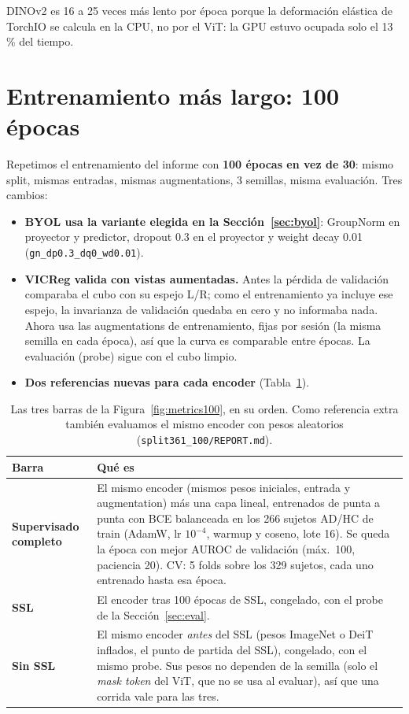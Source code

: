 \documentclass[11pt,a4paper]{article}
\begin{document}
DINOv2 es 16 a 25 veces más lento por época porque la deformación elástica de TorchIO se calcula en la CPU,
no por el ViT: la GPU estuvo ocupada solo el 13\,\% del tiempo.

\section{Entrenamiento más largo: 100 épocas}
\label{sec:e100}

Repetimos el entrenamiento del informe con \textbf{100 épocas en vez de 30}: mismo split, mismas
entradas, mismas augmentations, 3 semillas, misma evaluación. Tres cambios:

\begin{itemize}
\item \textbf{BYOL usa la variante elegida en la Sección~\ref{sec:byol}}: GroupNorm en proyector y
  predictor, dropout 0.3 en el proyector y weight decay 0.01 (\texttt{gn\_dp0.3\_dq0\_wd0.01}).
\item \textbf{VICReg valida con vistas aumentadas.} Antes la pérdida de validación comparaba el cubo
  con su espejo L/R; como el entrenamiento ya incluye ese espejo, la invarianza de validación
  quedaba en cero y no informaba nada. Ahora usa las augmentations de entrenamiento, fijas por
  sesión (la misma semilla en cada época), así que la curva es comparable entre épocas. La
  evaluación (probe) sigue con el cubo limpio.
\item \textbf{Dos referencias nuevas para cada encoder} (Tabla~\ref{tab:refs100}).
\end{itemize}

\begin{table}[H]
\centering
\small
\begin{tabularx}{\textwidth}{lX}
\toprule
Barra & Qué es \\
\midrule
\textbf{Supervisado completo} & El mismo encoder (mismos pesos iniciales, entrada y augmentation)
  más una capa lineal, entrenados de punta a punta con BCE balanceada en los 266 sujetos AD/HC
  de train (AdamW, lr $10^{-4}$, warmup y coseno, lote 16). Se queda la época con mejor AUROC de
  validación (máx.\ 100, paciencia 20). CV: 5 folds sobre los 329 sujetos, cada uno entrenado
  hasta esa época. \\
\textbf{SSL} & El encoder tras 100 épocas de SSL, congelado, con el probe de la
  Sección~\ref{sec:eval}. \\
\textbf{Sin SSL} & El mismo encoder \emph{antes} del SSL (pesos ImageNet o DeiT inflados, el
  punto de partida del SSL), congelado, con el mismo probe. Sus pesos no dependen de la semilla
  (solo el \emph{mask token} del ViT, que no se usa al evaluar), así que una corrida vale para
  las tres. \\
\bottomrule
\end{tabularx}
\caption{Las tres barras de la Figura~\ref{fig:metrics100}, en su orden. Como referencia extra
también evaluamos el mismo encoder con pesos aleatorios
(\nolinkurl{split361_100/REPORT.md}).}
\label{tab:refs100}
\end{table}
\end{document}
